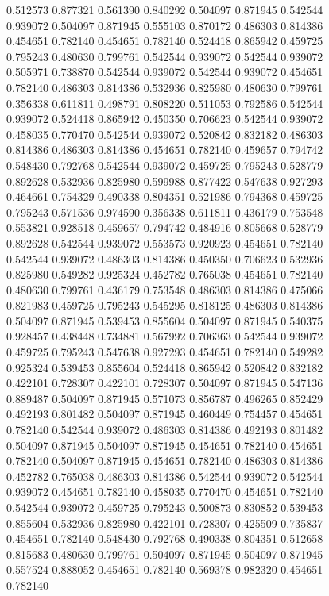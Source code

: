 \begin{figure}
\begin{center}
{  0.512573 0.877321
  0.561390 0.840292
  0.504097 0.871945
  0.542544 0.939072
  0.504097 0.871945
  0.555103 0.870172
  0.486303 0.814386
  0.454651 0.782140
  0.454651 0.782140
  0.524418 0.865942
  0.459725 0.795243
  0.480630 0.799761
  0.542544 0.939072
  0.542544 0.939072
  0.505971 0.738870
  0.542544 0.939072
  0.542544 0.939072
  0.454651 0.782140
  0.486303 0.814386
  0.532936 0.825980
  0.480630 0.799761
  0.356338 0.611811
  0.498791 0.808220
  0.511053 0.792586
  0.542544 0.939072
  0.524418 0.865942
  0.450350 0.706623
  0.542544 0.939072
  0.458035 0.770470
  0.542544 0.939072
  0.520842 0.832182
  0.486303 0.814386
  0.486303 0.814386
  0.454651 0.782140
  0.459657 0.794742
  0.548430 0.792768
  0.542544 0.939072
  0.459725 0.795243
  0.528779 0.892628
  0.532936 0.825980
  0.599988 0.877422
  0.547638 0.927293
  0.464661 0.754329
  0.490338 0.804351
  0.521986 0.794368
  0.459725 0.795243
  0.571536 0.974590
  0.356338 0.611811
  0.436179 0.753548
  0.553821 0.928518
  0.459657 0.794742
  0.484916 0.805668
  0.528779 0.892628
  0.542544 0.939072
  0.553573 0.920923
  0.454651 0.782140
  0.542544 0.939072
  0.486303 0.814386
  0.450350 0.706623
  0.532936 0.825980
  0.549282 0.925324
  0.452782 0.765038
  0.454651 0.782140
  0.480630 0.799761
  0.436179 0.753548
  0.486303 0.814386
  0.475066 0.821983
  0.459725 0.795243
  0.545295 0.818125
  0.486303 0.814386
  0.504097 0.871945
  0.539453 0.855604
  0.504097 0.871945
  0.540375 0.928457
  0.438448 0.734881
  0.567992 0.706363
  0.542544 0.939072
  0.459725 0.795243
  0.547638 0.927293
  0.454651 0.782140
  0.549282 0.925324
  0.539453 0.855604
  0.524418 0.865942
  0.520842 0.832182
  0.422101 0.728307
  0.422101 0.728307
  0.504097 0.871945
  0.547136 0.889487
  0.504097 0.871945
  0.571073 0.856787
  0.496265 0.852429
  0.492193 0.801482
  0.504097 0.871945
  0.460449 0.754457
  0.454651 0.782140
  0.542544 0.939072
  0.486303 0.814386
  0.492193 0.801482
  0.504097 0.871945
  0.504097 0.871945
  0.454651 0.782140
  0.454651 0.782140
  0.504097 0.871945
  0.454651 0.782140
  0.486303 0.814386
  0.452782 0.765038
  0.486303 0.814386
  0.542544 0.939072
  0.542544 0.939072
  0.454651 0.782140
  0.458035 0.770470
  0.454651 0.782140
  0.542544 0.939072
  0.459725 0.795243
  0.500873 0.830852
  0.539453 0.855604
  0.532936 0.825980
  0.422101 0.728307
  0.425509 0.735837
  0.454651 0.782140
  0.548430 0.792768
  0.490338 0.804351
  0.512658 0.815683
  0.480630 0.799761
  0.504097 0.871945
  0.504097 0.871945
  0.557524 0.888052
  0.454651 0.782140
  0.569378 0.982320
  0.454651 0.782140
}
\end{center}
\end{figure}

